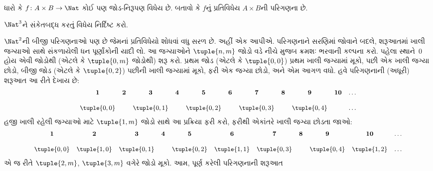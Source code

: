 \begin{prob}
ધારો કે $f \colon A \times B \to \Nat$ કોઈ પણ
જોડ-નિરૂપણ વિધેય છે. બતાવો કે $f$નું પ્રતિવિધેય
$A \times B$ની પરિગણના છે.
\end{prob}

\begin{prob}
$\Nat^3$ને સંકેતબદ્ધ કરતું વિધેય નિર્દિષ્ટ કરો.
\end{prob}
\endgroup


\begingroup
\makeatletter{}\makeatother


\label{guunit:OLP-0032}


\begin{explain}
$\Nat^2$ની બીજી પરિગણનાઓ પણ છે જેમનાં પ્રતિવિધેયો
શોધવાં વધુ સરળ છે. અહીં એક આપીએ.
પરિગણનાને સરણિમાં જોવાને બદલે, શરૂઆતમાં ખાલી
જગ્યાઓ સાથે સંકળાયેલી ધન પૂર્ણાંકોની યાદી લો.
આ જગ્યાઓને $\tuple{n,m}$ જોડો વડે નીચે મુજબ
ક્રમશઃ ભરવાની કલ્પના કરો. પહેલા સ્થાને~$0$ હોય
એવી જોડોથી (એટલે કે $\tuple{0,m}$ જોડોથી) શરૂ કરો.
પ્રથમ જોડ (એટલે કે $\tuple{0,0}$) પ્રથમ ખાલી
જગ્યામાં મૂકો, પછી એક ખાલી જગ્યા છોડો, બીજી જોડ
(એટલે કે $\tuple{0,2}$) પછીની ખાલી જગ્યામાં મૂકો,
ફરી એક જગ્યા છોડો, અને એમ આગળ વધો.
હવે પરિગણનાની (અધૂરી) શરૂઆત આ રીતે દેખાય છે:
\[\small
\begin{array}{@{}c c c c c c c c c c c@{}}
\mathbf 1 & \mathbf 2 & \mathbf 3 & \mathbf 4 & \mathbf 5 & \mathbf 6 & \mathbf 7 & \mathbf 8 & \mathbf 9 & \mathbf{10} & \dots \\ \\
\tuple{0,0} &  & \tuple{0,1} &  & \tuple{0,2} &  & \tuple{0,3} & & \tuple{0,4} &  & \dots \\
\end{array}
\]
હજી ખાલી રહેલી જગ્યાઓ માટે $\tuple{1,m}$ જોડો
સાથે આ પ્રક્રિયા ફરી કરો, ફરીથી એકાંતરે ખાલી
જગ્યા છોડતા જાઓ:
\[\small
\begin{array}{@{}c c c c c c c c c c c@{}}
\mathbf 1 & \mathbf 2 & \mathbf 3 & \mathbf 4 & \mathbf 5 & \mathbf 6 & \mathbf 7 & \mathbf 8 & \mathbf 9 & \mathbf{10} & \dots \\ \\
\tuple{0,0} & \tuple{1,0} & \tuple{0,1} &  & \tuple{0,2} & \tuple{1,1} &
\tuple{0,3} & & \tuple{0,4} &  \tuple{1,2} & \dots \\
\end{array}
\]
એ જ રીતે $\tuple{2,m}$, $\tuple{3,m}$ વગેરે
જોડો મૂકો. આમ, પૂર્ણ કરેલી પરિગણનાની શરૂઆત

\end{explain}
